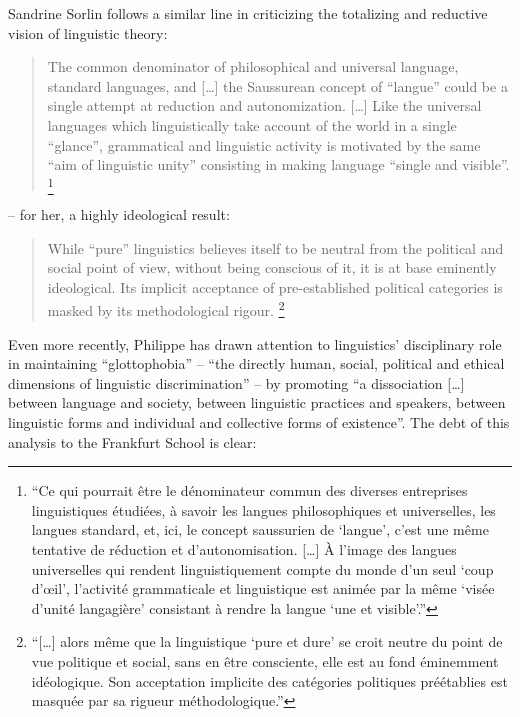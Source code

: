 \documentclass[output=paper]{langscibook}
\begin{document}
Sandrine Sorlin follows a similar line in criticizing the totalizing and reductive vision of linguistic theory:

\begin{quotation}
The common denominator of philosophical and universal language, standard languages, and […] the Saussurean concept of ``langue'' could be a single attempt at reduction and autonomization. […] Like the universal languages which linguistically take account of the world in a single ``glance'', grammatical and linguistic activity is motivated by the same ``aim of linguistic unity'' consisting in making language ``single and visible''. \citep[103]{Sorlin2012}\footnote{``Ce qui pourrait être le dénominateur commun des diverses entreprises linguistiques étudiées, à savoir les langues philosophiques et universelles, les langues standard, et, ici, le concept saussurien de `langue', c'est une même tentative de réduction et d'autonomisation. […] À l’image des langues universelles qui rendent linguistiquement compte du monde d’un seul `coup d’œil', l’activité grammaticale et linguistique est animée par la même `visée d’unité langagière' consistant à rendre la langue `une et visible'.''}
\end{quotation}

\noindent -- for her, a highly ideological result:

\begin{quotation}
While ``pure'' linguistics believes itself to be neutral from the political and social point of view, without being conscious of it, it is at base eminently ideological. Its implicit acceptance of pre-established political categories is masked by its methodological rigour. \citep[113]{Sorlin2012}\footnote{``[…] alors même que la linguistique `pure et dure' se croit neutre du point de vue politique et social, sans en être consciente, elle est au fond éminemment idéologique. Son acceptation implicite des catégories politiques préétablies est masquée par sa rigueur méthodologique.''}
\end{quotation}

Even more recently, Philippe \citet[73]{Blanchet2016} has drawn attention to linguistics' disciplinary role in maintaining ``glottophobia'' -- ``the directly human, social, political and ethical dimensions of linguistic discrimination'' -- by promoting ``a dissociation […] between language and society, between linguistic practices and speakers, between linguistic forms and individual and collective forms of existence''. The debt of this analysis to the Frankfurt School is clear:
\end{document}

